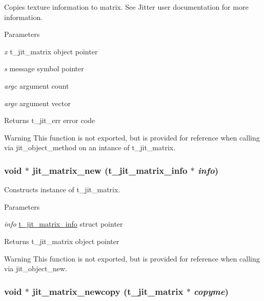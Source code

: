 Copies texture information to matrix. See Jitter user documentation for more information.


\begin{DoxyParams}{Parameters}
\item[{\em x}]t\_\-jit\_\-matrix object pointer \item[{\em s}]message symbol pointer \item[{\em argc}]argument count \item[{\em argv}]argument vector\end{DoxyParams}
\begin{DoxyReturn}{Returns}
t\_\-jit\_\-err error code
\end{DoxyReturn}
\begin{DoxyWarning}{Warning}
This function is not exported, but is provided for reference when calling via jit\_\-object\_\-method on an intance of t\_\-jit\_\-matrix. 
\end{DoxyWarning}
\hypertarget{group__matrixmod_gac7c617a1e6cb1cbf2a5a8cdc27697eff}{
\subsubsection[{jit\_\-matrix\_\-new}]{\setlength{\rightskip}{0pt plus 5cm}void $\ast$ jit\_\-matrix\_\-new ({\bf t\_\-jit\_\-matrix\_\-info} $\ast$ {\em info})}}
\label{group__matrixmod_gac7c617a1e6cb1cbf2a5a8cdc27697eff}


Constructs instance of t\_\-jit\_\-matrix. 
\begin{DoxyParams}{Parameters}
\item[{\em info}]\hyperlink{structt__jit__matrix__info}{t\_\-jit\_\-matrix\_\-info} struct pointer\end{DoxyParams}
\begin{DoxyReturn}{Returns}
t\_\-jit\_\-matrix object pointer
\end{DoxyReturn}
\begin{DoxyWarning}{Warning}
This function is not exported, but is provided for reference when calling via jit\_\-object\_\-new. 
\end{DoxyWarning}
\hypertarget{group__matrixmod_ga900b5d226f56a36d2285e64e7d501eb7}{
\subsubsection[{jit\_\-matrix\_\-newcopy}]{\setlength{\rightskip}{0pt plus 5cm}void $\ast$ jit\_\-matrix\_\-newcopy (t\_\-jit\_\-matrix $\ast$ {\em copyme})}}
\label{group__matrixmod_ga900b5d226f56a36d2285e64e7d501eb7}


